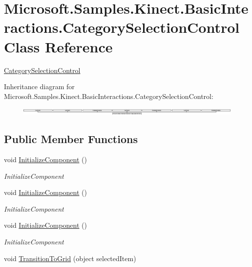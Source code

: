 \hypertarget{class_microsoft_1_1_samples_1_1_kinect_1_1_basic_interactions_1_1_category_selection_control}{\section{Microsoft.\-Samples.\-Kinect.\-Basic\-Interactions.\-Category\-Selection\-Control Class Reference}
\label{class_microsoft_1_1_samples_1_1_kinect_1_1_basic_interactions_1_1_category_selection_control}
}


\hyperlink{class_microsoft_1_1_samples_1_1_kinect_1_1_basic_interactions_1_1_category_selection_control}{Category\-Selection\-Control}  


Inheritance diagram for Microsoft.\-Samples.\-Kinect.\-Basic\-Interactions.\-Category\-Selection\-Control\-:\begin{figure}[H]
\begin{center}
\leavevmode
\includegraphics[height=0.388350cm]{class_microsoft_1_1_samples_1_1_kinect_1_1_basic_interactions_1_1_category_selection_control}
\end{center}
\end{figure}
\subsection*{Public Member Functions}
\begin{DoxyCompactItemize}
\item 
void \hyperlink{class_microsoft_1_1_samples_1_1_kinect_1_1_basic_interactions_1_1_category_selection_control_aea41c692f3eceec50693e060e6a441fc}{Initialize\-Component} ()
\begin{DoxyCompactList}\small\item\em Initialize\-Component \end{DoxyCompactList}\item 
void \hyperlink{class_microsoft_1_1_samples_1_1_kinect_1_1_basic_interactions_1_1_category_selection_control_aea41c692f3eceec50693e060e6a441fc}{Initialize\-Component} ()
\begin{DoxyCompactList}\small\item\em Initialize\-Component \end{DoxyCompactList}\item 
void \hyperlink{class_microsoft_1_1_samples_1_1_kinect_1_1_basic_interactions_1_1_category_selection_control_aea41c692f3eceec50693e060e6a441fc}{Initialize\-Component} ()
\begin{DoxyCompactList}\small\item\em Initialize\-Component \end{DoxyCompactList}\item 
void \hyperlink{class_microsoft_1_1_samples_1_1_kinect_1_1_basic_interactions_1_1_category_selection_control_a7a082ad58d934315c1ee338b1081022d}{Transition\-To\-Grid} (object selected\-Item)
\end{DoxyCompactItemize}
